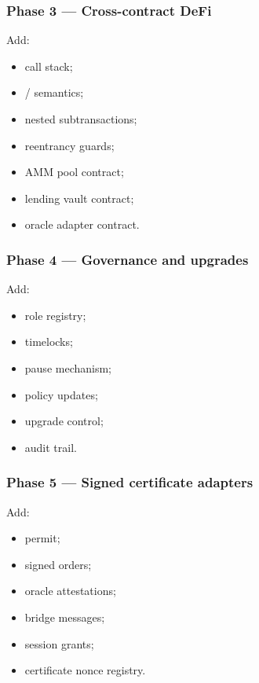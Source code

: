 \subsubsection{Phase 3 --- Cross-contract DeFi}

Add:

\begin{itemize}
  \item call stack;
  \item {} /  semantics;
  \item nested subtransactions;
  \item reentrancy guards;
  \item AMM pool contract;
  \item lending vault contract;
  \item oracle adapter contract.
\end{itemize}

\subsubsection{Phase 4 --- Governance and upgrades}

Add:

\begin{itemize}
  \item role registry;
  \item timelocks;
  \item pause mechanism;
  \item policy updates;
  \item upgrade control;
  \item audit trail.
\end{itemize}

\subsubsection{Phase 5 --- Signed certificate adapters}

Add:

\begin{itemize}
  \item permit;
  \item signed orders;
  \item oracle attestations;
  \item bridge messages;
  \item session grants;
  \item certificate nonce registry.
\end{itemize}

